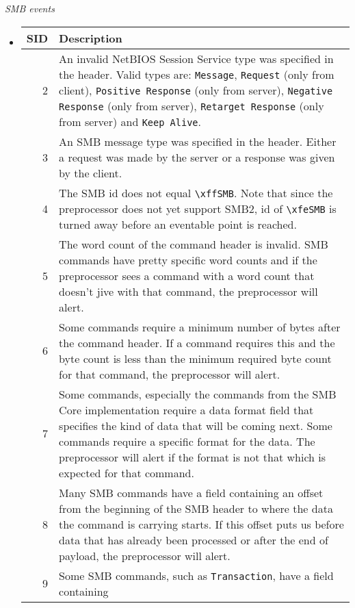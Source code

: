 \documentclass[english]{report}
\begin{document}
\textit{SMB events}
\begin{itemize}

\item[]
\begin{longtable}{|r|p{13.5cm}|}

\hline
SID & Description\\
\hline

\hline
  2 & An invalid NetBIOS Session Service type was specified in the header.
      Valid types are: \texttt{Message}, \texttt{Request} (only from client),
      \texttt{Positive Response} (only from server), \texttt{Negative Response}
      (only from server), \texttt{Retarget Response} (only from server) and
      \texttt{Keep Alive}.\\
\hline
  3 & An SMB message type was specified in the header. Either a request was
      made by the server or a response was given by the client.\\
\hline
  4 & The SMB id does not equal \texttt{\textbackslash xffSMB}. Note that since
      the preprocessor does not yet support SMB2, id of
      \texttt{\textbackslash xfeSMB} is turned away before an eventable point is
      reached.\\
\hline
  5 & The word count of the command header is invalid. SMB commands have
      pretty specific word counts and if the preprocessor sees a command with
      a word count that doesn't jive with that command, the preprocessor will
      alert.\\
\hline
  6 & Some commands require a minimum number of bytes after the command
      header. If a command requires this and the byte count is less than the
      minimum required byte count for that command, the preprocessor will
      alert.\\
\hline
  7 & Some commands, especially the commands from the SMB Core implementation
      require a data format field that specifies the kind of data that will be
      coming next. Some commands require a specific format for the data. The
      preprocessor will alert if the format is not that which is expected for
      that command.\\
\hline
  8 & Many SMB commands have a field containing an offset from the beginning
      of the SMB header to where the data the command is carrying starts. If
      this offset puts us before data that has already been processed or after
      the end of payload, the preprocessor will alert.\\
\hline
  9 & Some SMB commands, such as \texttt{Transaction}, have a field containing

\end{longtable}
\end{itemize}
\end{document}
